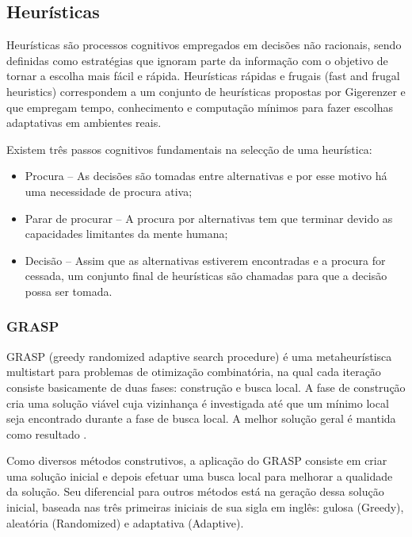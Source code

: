 \documentclass[a4paper, 12pt]{article}
\begin{document}
\subsection{Heurísticas}

Heurísticas são processos cognitivos empregados em decisões não racionais, sendo definidas como estratégias 
que ignoram parte da informação com o objetivo de tornar a escolha mais fácil e rápida.
\cite{doi:10.1146/annurev-psych-120709-145346} Heurísticas rápidas e frugais (fast and frugal heuristics) correspondem a um conjunto de heurísticas 
propostas por Gigerenzer e que empregam tempo, conhecimento e computação mínimos para fazer escolhas 
adaptativas em ambientes reais.\cite{gigerenzer1999simple}

Existem três passos cognitivos fundamentais na selecção de uma heurística:
\begin{itemize}
    \item Procura – As decisões são tomadas entre alternativas e por esse motivo há uma necessidade de procura ativa;
    \item Parar de procurar – A procura por alternativas tem que terminar devido as capacidades limitantes da mente humana;
    \item Decisão – Assim que as alternativas estiverem encontradas e a procura for cessada, um conjunto final de heurísticas são chamadas para que a decisão possa ser tomada.\cite{gigerenzer1999simple}  
\end{itemize}

\subsubsection{GRASP}

GRASP (greedy randomized adaptive search procedure) é uma metaheurístisca multistart para 
problemas de otimização combinatória, na qual cada iteração consiste basicamente de duas fases: construção e busca local. 
A fase de construção cria uma solução viável cuja vizinhança é investigada até que um mínimo local seja 
encontrado durante a fase de busca local. A melhor solução geral é mantida como resultado \cite{feo1995greedy}.

Como diversos métodos construtivos, a aplicação do GRASP consiste em criar uma solução inicial e depois efetuar uma busca local para melhorar a qualidade da solução. Seu diferencial para outros métodos está na geração dessa solução inicial, 
baseada nas três primeiras iniciais de sua sigla em inglês: gulosa (Greedy), aleatória 
(Randomized) e adaptativa (Adaptive).
\end{document}
